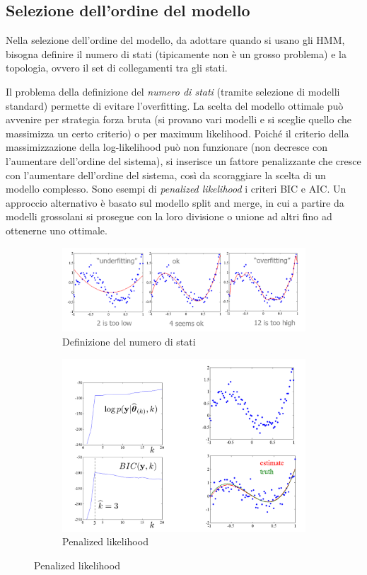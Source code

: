 \documentclass[a4paper,oneside,titlepage]{book}
\begin{document}
\subsection{Selezione dell'ordine del modello}
Nella selezione dell'ordine del modello, da adottare quando si usano gli HMM, bisogna definire il numero di stati (tipicamente non è un grosso problema) e la topologia, ovvero il set di collegamenti tra gli stati.

Il problema della definizione del \textit{numero di stati} (tramite selezione di modelli standard) permette di evitare l'overfitting. La scelta del modello ottimale può avvenire per strategia forza bruta (si provano vari modelli e si sceglie quello che massimizza un certo criterio) o per maximum likelihood. Poiché il criterio della massimizzazione della log-likelihood può non funzionare (non decresce con l'aumentare dell'ordine del sistema), si inserisce un fattore penalizzante che cresce con l'aumentare dell'ordine del sistema, così da scoraggiare la scelta di un modello complesso. Sono esempi di \textit{penalized likelihood} i criteri BIC e AIC. Un approccio alternativo è basato sul modello split and merge, in cui a partire da modelli grossolani si prosegue con la loro divisione o unione ad altri fino ad ottenerne uno ottimale.
\begin{figure}[htp]
	\begin{subfigure}{0.49\textwidth}
	    \centering
		\includegraphics[width=\textwidth, height=\textheight, keepaspectratio]{hmm6.png}
		\caption{Definizione del numero di stati}
	\end{subfigure}
	\hfill
	\begin{subfigure}{0.49\textwidth}
	    \centering
		\includegraphics[width=\textwidth, height=\textheight, keepaspectratio]{hmm7.png}
		\caption{Penalized likelihood}
	\end{subfigure}
\end{figure}
\end{document}
